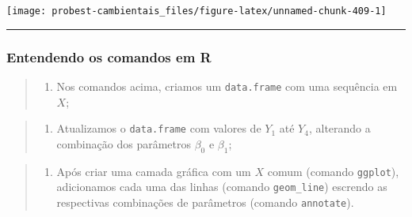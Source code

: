 \documentclass[
]{book}
\newenvironment{Shaded}{\begin{snugshade}}{\end{snugshade}}
\newcommand{\AttributeTok}[1]{\textcolor[rgb]{0.77,0.63,0.00}{#1}}
\newcommand{\DecValTok}[1]{\textcolor[rgb]{0.00,0.00,0.81}{#1}}
\newcommand{\FunctionTok}[1]{\textcolor[rgb]{0.00,0.00,0.00}{#1}}
\newcommand{\NormalTok}[1]{#1}
\newcommand{\SpecialCharTok}[1]{\textcolor[rgb]{0.00,0.00,0.00}{#1}}
\newcommand{\StringTok}[1]{\textcolor[rgb]{0.31,0.60,0.02}{#1}}
\providecommand{\tightlist}{%
  \setlength{\itemsep}{0pt}\setlength{\parskip}{0pt}}
\begin{document}
\begin{Shaded}
\end{Shaded}

\begin{center}\texttt{[image: probest-cambientais\_files/figure-latex/unnamed-chunk-409-1]} \end{center}

\begin{center}\rule{0.5\linewidth}{0.5pt}\end{center}

\hypertarget{entendendo-os-comandos-em-r}{%
\subsubsection*{Entendendo os comandos em R}\label{entendendo-os-comandos-em-r}}

\begin{quote}
\begin{enumerate}
\def\labelenumi{\arabic{enumi}.}
\tightlist
\item
  Nos comandos acima, criamos um \texttt{data.frame} com uma sequência em \(X\);
\end{enumerate}
\end{quote}

\begin{quote}
\begin{enumerate}
\def\labelenumi{\arabic{enumi}.}
\setcounter{enumi}{1}
\tightlist
\item
  Atualizamos o \texttt{data.frame} com valores de \(Y_1\) até \(Y_4\), alterando a combinação dos parâmetros \(\beta_0\) e \(\beta_1\);
\end{enumerate}
\end{quote}

\begin{quote}
\begin{enumerate}
\def\labelenumi{\arabic{enumi}.}
\setcounter{enumi}{2}
\tightlist
\item
  Após criar uma camada gráfica com um \(X\) comum (comando \texttt{ggplot}), adicionamos cada uma das linhas (comando \texttt{geom\_line}) escrendo as respectivas combinações de parâmetros (comando \texttt{annotate}).
\end{enumerate}
\end{quote}
\end{document}
